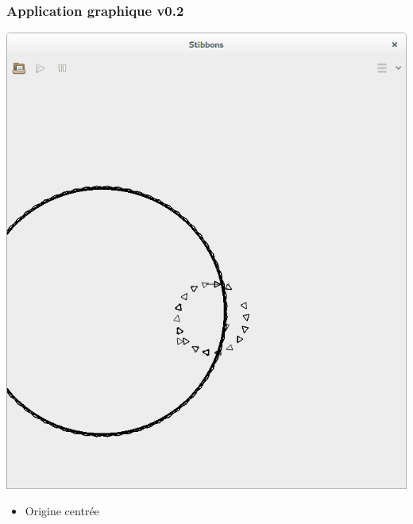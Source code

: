 \begin{frame}
\frametitle{Application graphique v0.2}
\begin{center}
\includegraphics[scale=0.16]{doc/report/screenshot/stibbons-0-2-2.png}
\end{center}

\begin{itemize}
	\item Origine centrée
\end{itemize}
\end{frame}


